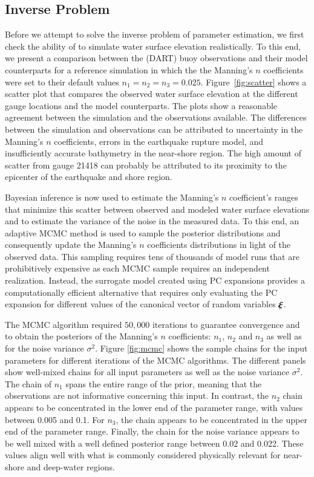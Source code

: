 \subsection{Inverse Problem} 
\label{sec:inverse}

Before we attempt to solve the inverse problem of parameter estimation, 
we first check the ability of \geoclaw to simulate water surface elevation
realistically. To this end, we present a comparison between the 
(DART) buoy observations and their \geoclaw model counterparts
for a reference simulation in which the the Manning's $n$ coefficients were set to their default values $n_1=n_2=n_3=0.025$. Figure~\ref{fig:scatter} 
shows a scatter plot that compares the observed 
water surface elevation at the different gauge locations and the \geoclaw model counterparts. The plots show a reasonable agreement between the simulation and the observations available.  The differences between the simulation and observations can be attributed to uncertainty in the Manning's $n$ coefficients, errors in the earthquake rupture model, and insufficiently accurate bathymetry in the near-shore region.  The high amount of scatter from gauge 21418 can probably be attributed to its proximity to the epicenter of the earthquake and shore region.

Bayesian inference is now used to estimate the Manning's 
$n$ coefficient's ranges that minimize this scatter between 
observed and modeled water surface elevations and to estimate the variance of the noise in the measured data.
To this end, an adaptive MCMC method is used to sample 
the posterior distributions \citep{Gareth2009,Haario2001} and consequently 
update the Manning's $n$ coefficients distributions in light of the 
observed data. This sampling requires tens of thousands of 
\geoclaw model runs that are prohibitively expensive as each MCMC 
sample requires an independent \geoclaw realization. Instead,
the surrogate model created using PC expansions provides a computationally
efficient alternative that requires only evaluating the PC expansion
for different values of the canonical vector of random variables $\xxi$.

The MCMC algorithm required $50,000$ iterations to guarantee convergence and to
obtain the posteriors of the Manning's $n$ coefficients:  $n_1$, $n_2$ and $n_3$
as well as for the noise variance $\sigma^2$. Figure \ref{fig:mcmc}  shows the sample
chains for the input parameters for different iterations of the MCMC algorithms.
The different panels show well-mixed chains for all input parameters as well as
the noise variance $\sigma^2$. The chain of  $n_{1}$ spans the entire range of the
prior, meaning that the observations are not informative  concerning this input.
In contrast, the $n_{2}$ chain appears to be concentrated in the  lower end of
the parameter range, with values between 0.005 and 0.1.  For $n_{3}$, the chain
appears to be concentrated in the  upper end of the parameter range. Finally,
the chain for the noise variance  appears to be well mixed with a well defined
posterior range between 0.02 and 0.022.  These values align well with what is
commonly considered physically relevant for near-shore and deep-water regions.

